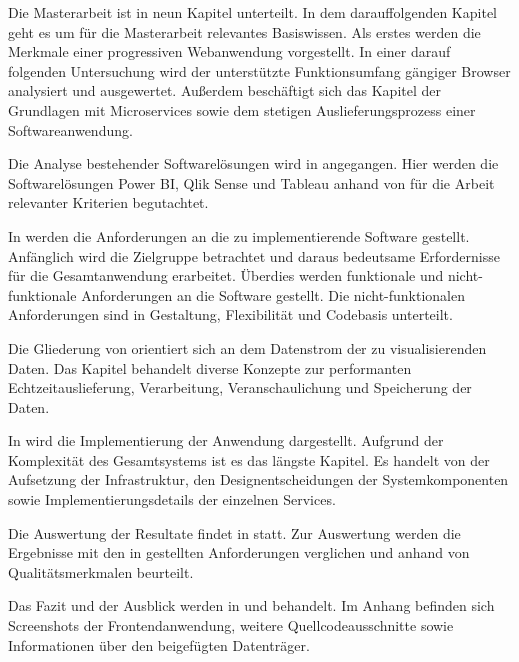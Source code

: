 Die Masterarbeit ist in neun Kapitel unterteilt. In dem darauffolgenden Kapitel geht es um für
die Masterarbeit relevantes Basiswissen. Als erstes werden die Merkmale einer progressiven
Webanwendung vorgestellt. In einer darauf folgenden Untersuchung wird der
unterstützte Funktionsumfang gängiger Browser analysiert und ausgewertet.
Außerdem beschäftigt sich das Kapitel der Grundlagen mit Microservices
sowie dem stetigen Auslieferungsprozess einer Softwareanwendung.

Die Analyse bestehender Softwarelösungen wird in 
angegangen. Hier werden die Softwarelösungen Power BI, Qlik Sense und Tableau anhand von für
die Arbeit relevanter Kriterien begutachtet.

In  werden die Anforderungen an die zu implementierende Software
gestellt. Anfänglich wird die Zielgruppe betrachtet und daraus bedeutsame Erfordernisse
für die Gesamtanwendung erarbeitet. Überdies werden funktionale und nicht-funktionale Anforderungen
an die Software gestellt. Die nicht-funktionalen Anforderungen sind in 
Gestaltung, Flexibilität und Codebasis unterteilt.

Die Gliederung von  orientiert sich an dem Datenstrom der zu visualisierenden
Daten. Das Kapitel behandelt diverse Konzepte zur performanten Echtzeitauslieferung, Verarbeitung,
Veranschaulichung und Speicherung der Daten.

In  wird die Implementierung der Anwendung dargestellt. Aufgrund der Komplexität
des Gesamtsystems ist es das längste Kapitel. Es handelt von der Aufsetzung der Infrastruktur, den Designentscheidungen
der Systemkomponenten sowie Implementierungsdetails der einzelnen Services.

Die Auswertung der Resultate findet in  statt. Zur Auswertung werden
die Ergebnisse mit den in  gestellten Anforderungen verglichen
und anhand von Qualitätsmerkmalen beurteilt.

Das Fazit und der Ausblick werden in  und  behandelt. Im Anhang befinden
sich Screenshots der Frontendanwendung, weitere Quellcodeausschnitte sowie Informationen
über den beigefügten Datenträger.
